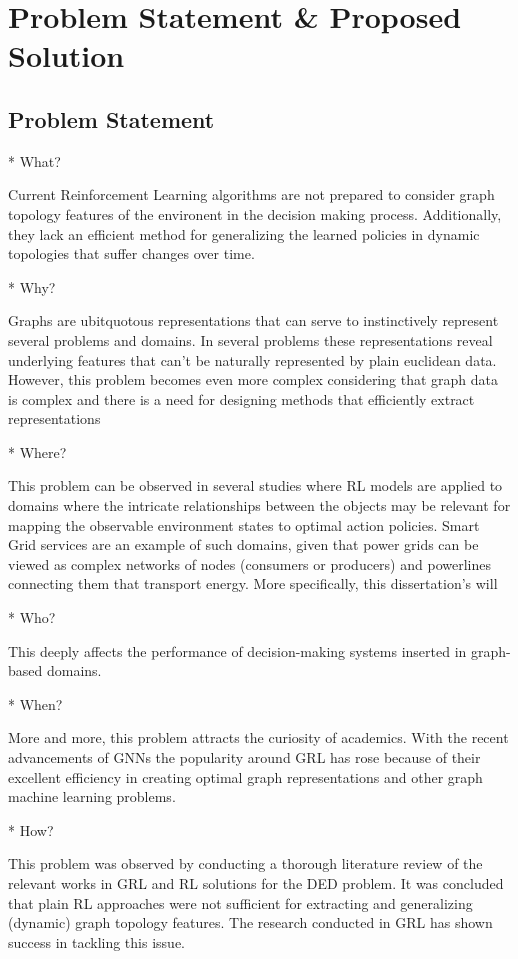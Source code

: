 \chapter{Problem Statement \& Proposed Solution} \label{chap:proposed-solution}

\section{Problem Statement}

* What?

Current Reinforcement Learning algorithms are not prepared to consider graph topology features of the environent in the decision making process. Additionally, they lack an efficient method for generalizing the learned policies in dynamic topologies that suffer changes over time.

* Why?

Graphs are ubitquotous representations that can serve to instinctively represent several problems and domains. In several problems these representations reveal underlying features that can't be naturally represented by plain euclidean data. However, this problem becomes even more complex considering that graph data is complex and there is a need for designing methods that efficiently extract representations

* Where?

This problem can be observed in several studies where RL models are applied to domains where the intricate relationships between the objects may be relevant for mapping the observable environment states to optimal action policies. Smart Grid services are an example of such domains, given that power grids can be viewed as complex networks of nodes (consumers or producers) and powerlines connecting them that transport energy. More specifically, this dissertation's will

* Who?

This deeply affects the performance of decision-making systems inserted in graph-based domains.

* When?

More and more, this problem attracts the curiosity of academics. With the recent advancements of GNNs the popularity around \ac{GRL} has rose because of their excellent efficiency in creating optimal graph representations and other graph machine learning problems.

* How? 

This problem was observed by conducting a thorough literature review of the relevant works in \ac{GRL} and \ac{RL} solutions for the \ac{DED} problem. It was concluded that plain \ac{RL} approaches were not sufficient for extracting and generalizing (dynamic) graph topology features. The research conducted in \ac{GRL} has shown success in tackling this issue.

